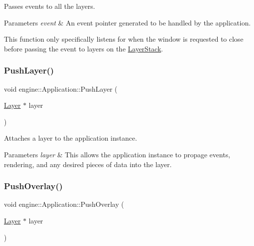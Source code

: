 Passes events to all the layers. 


\begin{DoxyParams}{Parameters}
{\em event} & An event pointer generated to be handled by the application.\\
\hline
\end{DoxyParams}
This function only specifically listens for when the window is requested to close before passing the event to layers on the \hyperlink{classengine_1_1LayerStack}{Layer\+Stack}. \mbox{\label{classengine_1_1Application_adb129a86a6cdbd80b25094d08605d213}} 
\subsubsection{\texorpdfstring{Push\+Layer()}{PushLayer()}}
{\footnotesize\ttfamily void engine\+::\+Application\+::\+Push\+Layer (\begin{DoxyParamCaption}\item[{\hyperlink{classengine_1_1Layer}{Layer} $\ast$}]{layer }\end{DoxyParamCaption})}



Attaches a layer to the application instance. 


\begin{DoxyParams}{Parameters}
{\em layer} & This allows the application instance to propage events, rendering, and any desired pieces of data into the layer. \\
\hline
\end{DoxyParams}
\mbox{\label{classengine_1_1Application_a00041c455b5699665d21662be95abd85}} 
\subsubsection{\texorpdfstring{Push\+Overlay()}{PushOverlay()}}
{\footnotesize\ttfamily void engine\+::\+Application\+::\+Push\+Overlay (\begin{DoxyParamCaption}\item[{\hyperlink{classengine_1_1Layer}{Layer} $\ast$}]{layer }\end{DoxyParamCaption})}

